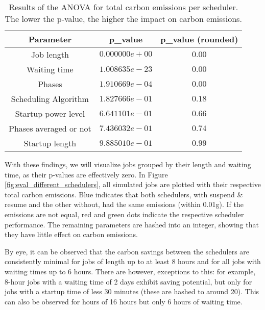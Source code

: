 \begin{table}[h!]
    \centering
    \begin{tabular}{|c|c|c|}
    \hline
        Parameter & p\_value & p\_value (rounded) \\ \hline
        Job length & $0.000000e+00$ & $0.00$ \\ \hline
        Waiting time &  $1.008635e-23$ & $0.00$ \\ \hline
        Phases &  $1.910669e-04$ & $0.00$ \\ \hline
        Scheduling Algorithm &  $1.827666e-01$ & $0.18$ \\ \hline
        Startup power level &  $6.641101e-01$ & $0.66$ \\ \hline
        Phases averaged or not &  $7.436032e-01$ & $0.74$ \\ \hline
        Startup length &  $9.885010e-01$ & $0.99$ \\ \hline
    \end{tabular}
    \caption{Results of the ANOVA for total carbon emissions per scheduler. The lower the p-value, the higher the impact on carbon emissions.}
\label{tab:scheduler_anova}
\end{table}

With these findings, we will visualize jobs grouped by their length and waiting time, as their p-values are effectively zero.
In Figure \ref{fig:eval_different_schedulers}, all simulated jobs are plotted with their respective total carbon emissions. Blue indicates that both schedulers, with suspend \& resume and the other without, had the same emissions (within 0.01g). If the emissions are not equal, red and green dots indicate the respective scheduler performance.
The remaining parameters are hashed into an integer, showing that they have little effect on carbon emissions.

By eye, it can be observed that the carbon savings between the schedulers are consistently minimal for jobs of length up to at least 8 hours and for all jobs with waiting times up to 6 hours.
There are however, exceptions to this: for example, 8-hour jobs with a waiting time of 2 days exhibit saving potential, but only for jobs with a startup time of less 30 minutes (these are hashed to around 20). This can also be observed for hours of 16 hours but only 6 hours of waiting time.

